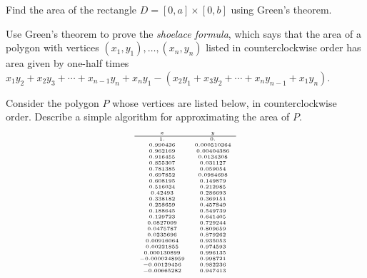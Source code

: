 \documentclass{watsonbook}
\begin{document}

\begin{aexercise}
  Find the area of the rectangle $D=[0,a]\times[0,b]$ using Green's
  theorem.
\end{aexercise}

\begin{aexercise}
Use Green's theorem to prove the \textit{shoelace
  formula}, which says that the area of a polygon with vertices
$(x_1,y_1),\ldots,(x_n,y_n)$ listed in counterclockwise order has area
given by one-half times
$x_1y_2 + x_2 y_3 + \cdots + x_{n-1}y_n + x_n y_1 - (x_2 y_1 + x_3 y_2
+ \cdots + x_{n}y_{n-1}+ x_1 y_n)$.
\end{aexercise}

\begin{aexercise}
Consider the polygon $P$ whose vertices are listed below, in counterclockwise order. Describe a simple algorithm for approximating the area of $P$. 
$$ \tiny
\begin{array}{cc}
  x & y \\ \hline 
 1. & 0. \\
 0.990436 & 0.000510364 \\
 0.962169 & 0.00404386 \\
 0.916455 & 0.0134308 \\
 0.855307 & 0.031127 \\
 0.781385 & 0.059054 \\
 0.697852 & 0.0984698 \\
 0.608195 & 0.149879 \\
 0.516034 & 0.212985 \\
 0.42493 & 0.286693 \\
 0.338182 & 0.369151 \\
 0.258659 & 0.457849 \\
 0.188645 & 0.549739 \\
 0.129723 & 0.641405 \\
 0.0827009 & 0.729244 \\
 0.0475787 & 0.809659 \\
 0.0235696 & 0.879262 \\
 0.00916064 & 0.935053 \\
 0.00221855 & 0.974593 \\
 0.000130899 & 0.996135 \\
 -0.0000248959 & 0.998721 \\
 -0.00129456 & 0.982236 \\
 -0.00665282 & 0.947413 \\

\end{array}$$
\end{aexercise}
\end{document}
